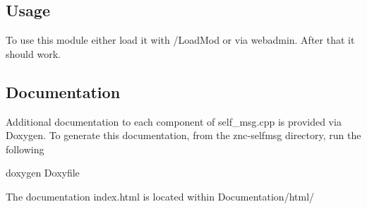 \subsection*{Usage}

To use this module either load it with /\+Load\+Mod or via webadmin. After that it should work.

\subsection*{Documentation}

Additional documentation to each component of self\+\_\+msg.\+cpp is provided via Doxygen. To generate this documentation, from the znc-\/selfmsg directory, run the following 
\begin{DoxyCode}
doxygen Doxyfile
\end{DoxyCode}


The documentation \textquotesingle{}index.\+html\textquotesingle{} is located within Documentation/html/ 